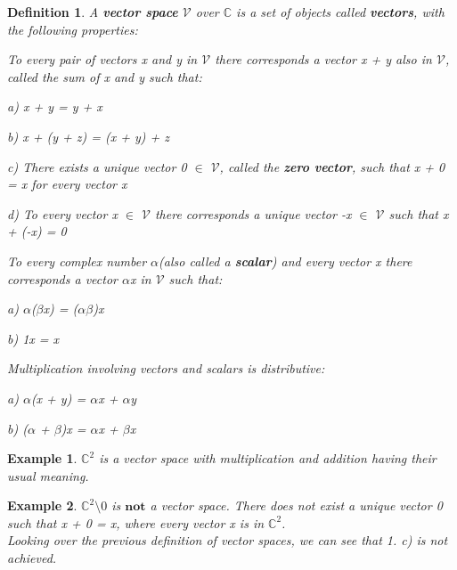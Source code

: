 \documentclass[12pt,a4paper]{article}
\newtheorem{defn}[thm]{Definition}
\newtheorem{exmp}{Example}[section]
\begin{document}
\begin{defn} A \textbf{vector space} $\mathcal{V}$ over $\mathbb{C}$ is a set of objects called \textbf{vectors}, with the following properties:
\item[1.] To every pair of vectors x and y in $\mathcal{V}$ there corresponds a vector x + y also in $\mathcal{V}$, called the \textit{sum} of x and y such that:
\item \hspace{1cm} a) x + y = y + x
\item \hspace{1cm} b) x + (y + z) = (x  + y) + z
\item \hspace{1cm} c) There exists a unique vector 0 $\in$ $\mathcal{V}$, called the \textbf{zero vector}, such that x + 0 = x for every vector x
\item \hspace{1cm} d) To every vector x $\in$ $\mathcal{V}$ there corresponds a unique vector -x $\in$ $\mathcal{V}$ such that x + (-x) = 0
\\
\item[2.] To every complex number $\alpha$(also called a \textbf{scalar}) and every vector x there corresponds a vector $\alpha$x in $\mathcal{V}$ such that:
\item \hspace{1cm} a) $\alpha$($\beta$x) = ($\alpha$$\beta$)x
\item \hspace{1cm} b) 1x = x
\\
\item[3.] Multiplication involving vectors and scalars is distributive:
\item \hspace{1cm} a) $\alpha$(x + y) = $\alpha$x + $\alpha$y
\item \hspace{1cm} b) ($\alpha$ + $\beta$)x = $\alpha$x + $\beta$x
\end{defn}
\begin{exmp}$\mathbb{C}^2$ is a vector space with multiplication and addition having their usual meaning.
\end{exmp}
\begin{exmp}$\mathbb{C}^2\setminus 0$ is $\textbf{not}$ a vector space. There does not exist a unique vector 0 such that x + 0 = x, where every vector x is in $\mathbb{C}^2$.\\
Looking over the previous definition of vector spaces, we can see that 1. c) is not achieved.
\end{exmp}
\end{document}
